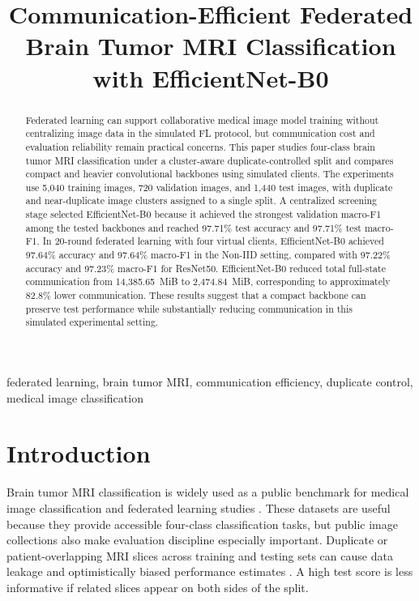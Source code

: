 \documentclass[conference]{IEEEtran}
\title{Communication-Efficient Federated Brain Tumor MRI Classification with EfficientNet-B0}
\author{}
\begin{document}
\maketitle

\begin{abstract}
Federated learning can support collaborative medical image model training without centralizing image data in the simulated FL protocol, but communication cost and evaluation reliability remain practical concerns. This paper studies four-class brain tumor MRI classification under a cluster-aware duplicate-controlled split and compares compact and heavier convolutional backbones using simulated clients. The experiments use 5,040 training images, 720 validation images, and 1,440 test images, with duplicate and near-duplicate image clusters assigned to a single split. A centralized screening stage selected EfficientNet-B0 because it achieved the strongest validation macro-F1 among the tested backbones and reached 97.71\% test accuracy and 97.71\% test macro-F1. In 20-round federated learning with four virtual clients, EfficientNet-B0 achieved 97.64\% accuracy and 97.64\% macro-F1 in the Non-IID setting, compared with 97.22\% accuracy and 97.23\% macro-F1 for ResNet50. EfficientNet-B0 reduced total full-state communication from 14,385.65~MiB to 2,474.84~MiB, corresponding to approximately 82.8\% lower communication. These results suggest that a compact backbone can preserve test performance while substantially reducing communication in this simulated experimental setting.
\end{abstract}

\begin{IEEEkeywords}
federated learning, brain tumor MRI, communication efficiency, duplicate control, medical image classification
\end{IEEEkeywords}

\section{Introduction}
Brain tumor MRI classification is widely used as a public benchmark for medical image classification and federated learning studies \cite{nickparvar_brain_tumor_mri,bentemessek2025brain,khatoon2026resnet50,ghanta2025federated}. These datasets are useful because they provide accessible four-class classification tasks, but public image collections also make evaluation discipline especially important. Duplicate or patient-overlapping MRI slices across training and testing sets can cause data leakage and optimistically biased performance estimates \cite{melo2026exploiting,siam2026brain,naseer2026medfl}. A high test score is less informative if related slices appear on both sides of the split.
\end{document}
